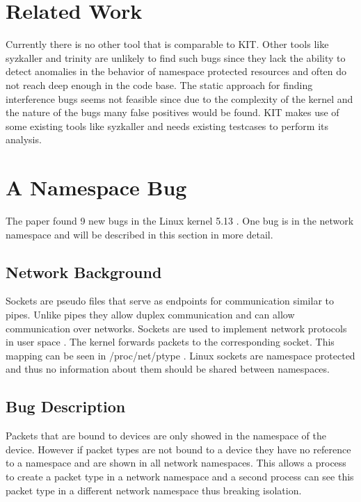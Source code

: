 \documentclass[10pt,twocolumn,a4paper]{article}
\begin{document}
\section{Related Work}
Currently there is no other tool that is comparable to  KIT. Other tools like syzkaller\cite{4} and trinity\cite{5} are
unlikely to find such bugs since they lack the ability to detect anomalies in the behavior of
namespace protected resources and often do not reach deep enough in the code base.
The static approach for finding interference bugs seems not feasible
since due to the complexity of the kernel and the nature of the bugs many false positives would
be found. KIT makes use of some existing tools like syzkaller and needs existing testcases to
perform its analysis\cite{0}\cite{2}.
\section{A Namespace Bug}\label{sec:bug}
The paper found 9 new bugs in the Linux kernel 5.13 \cite{0}. One bug is in the network namespace
and will be described in this section in more detail. 
\subsection{Network Background}
Sockets are pseudo files that serve as endpoints for communication similar to pipes. Unlike pipes
they allow duplex communication and can allow communication over networks\cite{5}. Sockets are
used to implement network protocols in user space \cite{5}. The kernel forwards packets to the
corresponding socket. This mapping can be seen in /proc/net/ptype \cite{6}. Linux sockets are
namespace protected and thus no information about them should be shared between namespaces.

\subsection{Bug Description}
Packets that are bound to devices are only showed in the namespace of the device. However if packet
types are not bound to a device they have no reference to a namespace and are shown in all network
namespaces. This allows a process to create a packet type in a network namespace and a second
process can see this packet type in a different network namespace thus breaking isolation.
\end{document}
